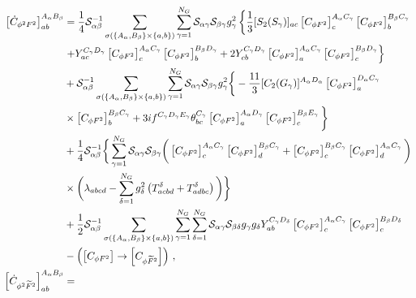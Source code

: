 \begin{align}
    \left[\dot C_{\phi^2 F^2}\right]_{ab}^{A_\alpha B_\beta} &= 
    \frac{1}{4} \mathcal S_{\alpha\beta}^{-1} \sum_{\sigma(\{A_\alpha,B_\beta\}\times \{a,b\})} \sum_{\gamma=1}^{N_G}\mathcal S_{\alpha\gamma}\mathcal S_{\beta\gamma} g_\gamma^2 \left\{\frac{1}{3}[S_2(S_\gamma)]_{ac}\left[C_{\phi F^2}\right]_{c}^{A_\alpha C_\gamma} \left[C_{\phi F^2}\right]_{b}^{B_\beta C_\gamma}\right.\nonumber \\
    &\left.+ Y_{ac}^{C_\gamma D_\gamma} \left[C_{\phi F^2}\right]_{c}^{A_\alpha C_\gamma} \left[C_{\phi F^2}\right]_{b}^{B_\beta D_\gamma} + 2 Y_{cb}^{C_\gamma D_\gamma} \left[C_{\phi F^2}\right]_{a}^{A_\alpha C_\gamma} \left[C_{\phi F^2}\right]_{c}^{B_\beta D_\gamma} \right\}\nonumber\\
    &+\mathcal S_{\alpha\beta}^{-1}\sum_{\sigma(\{A_\alpha,B_\beta\}\times \{a,b\})}\sum_{\gamma=1}^{N_G}\mathcal S_{\alpha\gamma}\mathcal S_{\beta\gamma} g_\gamma^2\bigg\{-\frac{11}{3} [C_2(G_\gamma)]^{A_\alpha D_\alpha}\left[C_{\phi F^2}\right]_{a}^{D_\alpha C_\gamma}\nonumber \\
    &\times \left[C_{\phi F^2}\right]_{b}^{B_\beta C_\gamma}+ 3i f^{C_\gamma D_\gamma E_\gamma} \theta^{C_\gamma}_{bc} \left[C_{\phi F^2}\right]_{a}^{A_\alpha D_\gamma} \left[C_{\phi F^2}\right]_{c}^{B_\beta E_\gamma}\bigg\}\nonumber\\
    &+\frac{1}{4}\mathcal S_{\alpha\beta}^{-1}\bigg\{\sum_{\gamma=1}^{N_G}\mathcal S_{\alpha\gamma}\mathcal S_{\beta\gamma}\bigg(\left[C_{\phi F^2}\right]_{c}^{A_\alpha C_\gamma} \left[C_{\phi F^2}\right]_{d}^{B_\beta C_\gamma}+\left[C_{\phi F^2}\right]_{c}^{B_\beta C_\gamma} \left[C_{\phi F^2}\right]_{d}^{A_\alpha C_\gamma}\bigg)\nonumber \\
    &\times \bigg(\lambda_{abcd}-\sum_{\delta=1}^{N_G}g_\delta^2\left(T^\delta_{acbd}+T^\delta_{adbc}\right)\bigg)\bigg\}\nonumber\\
    & + \frac{1}{2}\mathcal S_{\alpha\beta}^{-1} \sum_{\sigma(\{A_\alpha,B_\beta\}\times \{a,b\})}\sum_{\gamma=1}^{N_G}\sum_{\delta=1}^{N_G}\mathcal S_{\alpha\gamma}\mathcal S_{\beta\delta} g_\gamma g_\delta Y_{ab}^{C_\gamma D_\delta} \left[C_{\phi F^2}\right]_{c}^{A_\alpha C_\gamma} \left[C_{\phi F^2}\right]_{c}^{B_\beta D_\delta}\nonumber\\
    & - \left(\left[C_{\phi F^2}\right]\to \left[C_{\phi \tildee F^2}\right]\right)\,,
    \label{eq:phi2F2-phiF2xphiF2}
\\
    \left[\dot C_{\phi^2 \tildee F^2}\right]_{ab}^{A_\alpha B_\beta} &= 

\end{align}
